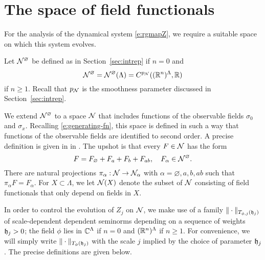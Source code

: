 
\section{The space of field functionals}
\label{sec:Ncal}

For the analysis of the dynamical system \eqref{e:rgmapZ}, we require a suitable
space on which this system evolves.

Let $\mathcal{N}^\varnothing$ be defined as in Section~\ref{sec:intrep} if $n = 0$ and
\begin{equation}
\label{e:Ncaldef}
\mathcal{N}^\varnothing
	= \mathcal{N}^\varnothing(\Lambda)
	= C^{p_{\mathcal{N}}}(({\mathbb R}^n)^\Lambda,{\mathbb R})
\end{equation}
if $n \ge 1$. Recall that $p_{\mathcal{N}}$ is the smoothness parameter discussed in
Section~\ref{sec:intrep}.

We extend $\mathcal{N}^\varnothing$ to a space $\mathcal{N}$
that includes functions of the observable fields $\sigma_0$ and $\sigma_x$.
Recalling \eqref{e:generating-fn}, this space is defined in such a way that
functions of the observable fields are identified to second order. A precise
definition is given in
in \cite[Section~\ref{phi4-sec:phi4observables_representation}]{ST-phi4}.
The upshot is that every $F \in \mathcal{N}$ has the form
\begin{equation}
\label{e:obs-decomp}
F = F_\varnothing + F_a + F_b + F_{ab},
	\quad
F_\alpha \in \mathcal{N}^\varnothing.
\end{equation}
There are natural projections $\pi_\alpha : \mathcal{N} \rightarrow \mathcal{N}_\alpha$ with
$\alpha = \varnothing, a, b, ab$ such that $\pi_\alpha F = F_\alpha$.
For $X \subset \Lambda$, we let $\mathcal{N}(X)$ denote the subset of $\mathcal{N}$ consisting
of field functionals that only depend on fields in $X$.

In order to control the evolution of $Z_j$ on $\mathcal{N}$, we make use of a family
$\|\cdot\|_{T_{\phi,j}(\mathfrak{h}_j)}$ of scale-dependent dependent seminorms depending on a
sequence of weights $\mathfrak{h}_j > 0$; the field $\phi$ lies in $\mathbb{C}^\Lambda$ if $n = 0$ and
$({\mathbb R}^n)^\Lambda$ if $n \ge 1$. For convenience,
we will simply write $\|\cdot\|_{T_\phi(\mathfrak{h}_j)}$ with the scale $j$ implied by the
choice of parameter $\mathfrak{h}_j$. The precise definitions are given below.

